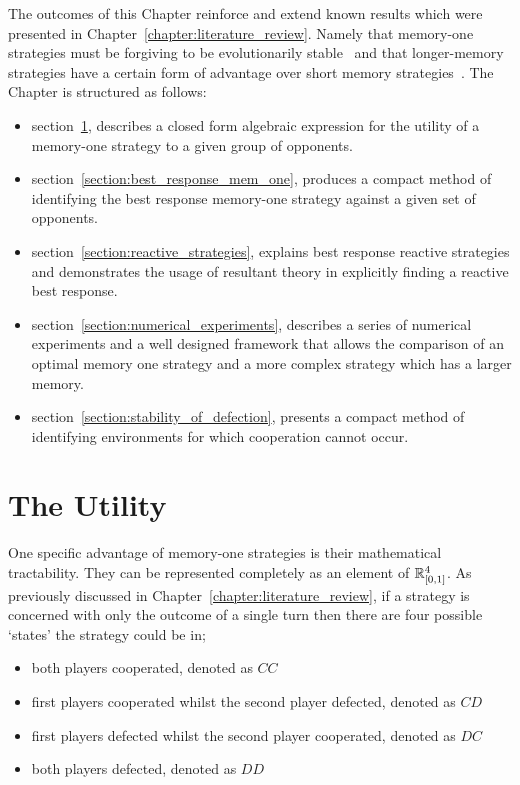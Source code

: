 The outcomes of this Chapter reinforce and extend known results which were presented in
Chapter~\ref{chapter:literature_review}. Namely that memory-one strategies must
be forgiving to be evolutionarily stable~\cite{Stewart2013, Stewart2016} and
that longer-memory strategies have a certain form of advantage over short memory
strategies~\cite{Hilbe2017, Pan2015}. The Chapter is structured as follows:

\begin{itemize}
    \item section~\ref{section:utility}, describes a closed form algebraic expression for
    the utility of a memory-one strategy to a given group of opponents.
    \item section~\ref{section:best_response_mem_one}, produces a compact method
    of identifying the best response memory-one strategy against a given set
    of opponents.
    \item section~\ref{section:reactive_strategies}, explains best response reactive
    strategies and demonstrates the usage of resultant theory in explicitly finding
    a reactive best response.
    \item section~\ref{section:numerical_experiments}, describes a series of numerical experiments
    and a well designed framework that allows the
    comparison of an optimal memory one strategy and a more complex strategy which
    has a larger memory.
    \item section~\ref{section:stability_of_defection}, presents a compact method of identifying environments
    for which cooperation cannot occur.
\end{itemize}


\section{The Utility}\label{section:utility}

One specific advantage of memory-one strategies is their mathematical
tractability. They can be represented completely as an element of \(\mathbb{R}^{4}_{[0, 1]}\).
As previously discussed in Chapter~\ref{chapter:literature_review},
if a strategy is concerned with only the outcome of a single turn then there are
four possible `states' the strategy could be in;

\begin{itemize}
    \item both players cooperated, denoted as \(CC\)
    \item first players cooperated whilst the second player defected, denoted as \(CD\)
    \item first players defected whilst the second player cooperated, denoted as \(DC\)
    \item both players defected, denoted as \(DD\)
\end{itemize}

